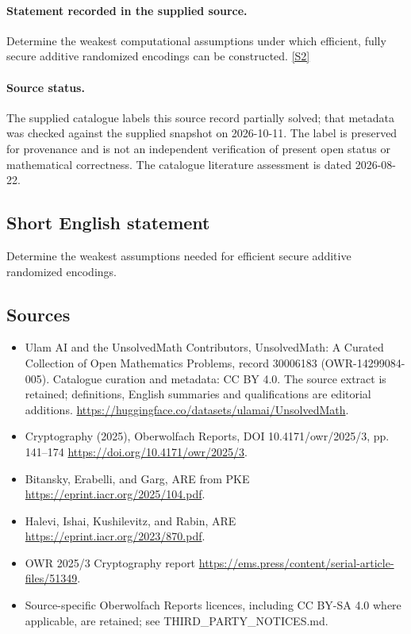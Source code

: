 \documentclass[11pt]{article}
\begin{document}
\paragraph{Statement recorded in the supplied source.}
Determine the weakest computational assumptions under which efficient, fully secure additive randomized encodings can be constructed. \href{https://doi.org/10.4171/owr/2025/3}{[S2]}
\paragraph{Source status.}
The supplied catalogue labels this source record partially solved; that metadata was checked against the supplied snapshot on 2026-10-11. The label is preserved for provenance and is not an independent verification of present open status or mathematical correctness. The catalogue literature assessment is dated 2026-08-22.
\subsection{Short English statement}
Determine the weakest assumptions needed for efficient secure additive randomized encodings.
\subsection{Sources}
\begin{itemize}
\item[S1] Ulam AI and the UnsolvedMath Contributors, UnsolvedMath: A Curated Collection of Open Mathematics Problems, record 30006183 (OWR-14299084-005). Catalogue curation and metadata: CC BY 4.0. The source extract is retained; definitions, English summaries and qualifications are editorial additions.
\url{https://huggingface.co/datasets/ulamai/UnsolvedMath}.
\item[S2] Cryptography (2025), Oberwolfach Reports, DOI 10.4171/owr/2025/3, pp. 141--174
\url{https://doi.org/10.4171/owr/2025/3}.
\item[S3] Bitansky, Erabelli, and Garg, ARE from PKE
\url{https://eprint.iacr.org/2025/104.pdf}.
\item[S4] Halevi, Ishai, Kushilevitz, and Rabin, ARE
\url{https://eprint.iacr.org/2023/870.pdf}.
\item[S5] OWR 2025/3 Cryptography report
\url{https://ems.press/content/serial-article-files/51349}.
\item Source-specific Oberwolfach Reports licences, including CC BY-SA 4.0 where applicable, are retained; see THIRD\_PARTY\_NOTICES.md.
\end{itemize}
\end{document}
